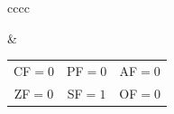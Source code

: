 \documentclass[12pt,a4paper]{report}
\begin{document}
\begin{tabular}{cccc}
 &
    \begin{tabular}{ccc}
    CF$=0$ & PF$=0$ & AF$=0$\\
    ZF$=0$ & SF$=1$ & OF$=0$
    \end{tabular}
\end{tabular}
\end{document}
